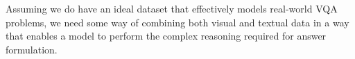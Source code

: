 Assuming we do have an ideal dataset that effectively models real-world VQA problems, we need some way of combining both visual and textual data in a way that enables a model to perform the complex reasoning required for answer formulation.






